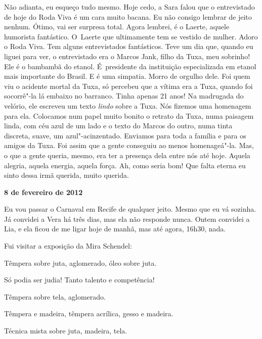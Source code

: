 Não adianta, eu esqueço tudo mesmo. Hoje cedo, a Sara falou que o
entrevistado de hoje do Roda Viva é um cara muito bacana. Eu não consigo
lembrar de jeito nenhum. Ótimo, vai ser surpresa total. Agora lembrei, é
o Laerte, aquele humorista fantástico. O~Laerte que ultimamente tem se
vestido de mulher. Adoro o Roda Viva. Tem alguns entrevistados
fantásticos. Teve um dia que, quando eu liguei para ver, o entrevistado
era o Marcos Jank, filho da Tuxa, meu sobrinho! Ele é o bambambã do
etanol. É~presidente da instituição especializada em etanol mais
importante do Brasil. E é uma simpatia. Morro de orgulho dele. Foi quem
viu o acidente mortal da Tuxa, só percebeu que a vítima era a Tuxa,
quando foi socorrê"-la lá embaixo no barranco. Tinha apenas 21 anos! Na
madrugada do velório, ele escreveu um texto \emph{lindo} sobre a Tuxa.
Nós fizemos uma homenagem para ela. Colocamos num papel muito bonito o
retrato da Tuxa, numa paisagem linda, com céu azul de um lado e o texto
do Marcos do outro, numa tinta discreta, suave, um azul"-acinzentado.
Enviamos para toda a família e para os amigos da Tuxa. Foi assim que a
gente conseguiu ao menos homenageá"-la. Mas, o que a gente queria,
mesmo, era ter a presença dela entre nós até hoje. Aquela alegria,
aquela energia, aquela força. Ah, como seria bom! Que falta eterna eu
sinto dessa irmã querida, muito querida.

\begin{center}\asterisc{}\end{center}

\begin{flushright}\textbf{8 de fevereiro de 2012}\end{flushright}


Eu vou passar o Carnaval em Recife de qualquer jeito. Mesmo que eu vá
sozinha. Já convidei a Vera há três dias, mas ela não responde nunca.
Ontem convidei a Lia, e ela ficou de me ligar hoje de manhã, mas até
agora, 16h30, nada.

Fui visitar a exposição da Mira Schendel:

Têmpera sobre juta, aglomerado, óleo sobre juta.

Só podia ser judia! Tanto talento e competência!

Têmpera sobre tela, aglomerado.

Têmpera e madeira, têmpera acrílica, gesso e madeira.

Técnica mista sobre juta, madeira, tela.

\begin{center}\asterisc{}\end{center}

